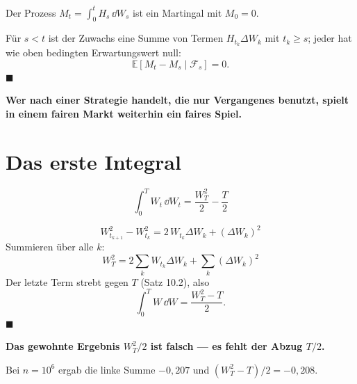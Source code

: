 \begin{merksatz}
Der Prozess $M_t = \int_0^t H_s\,\dd W_s$ ist ein Martingal mit $M_0 = 0$.

Für $s < t$ ist der Zuwachs eine Summe von Termen $H_{t_k}\Delta W_k$ mit $t_k \ge s$; jeder hat wie oben bedingten Erwartungswert null:
\[ \mathbb{E}[M_t - M_s \mid \mathcal F_s] = 0 . \]
$\blacksquare$

\begin{center}
\begin{minipage}{0.9\textwidth}
\textbf{Wer nach einer Strategie handelt, die nur Vergangenes benutzt, spielt in einem fairen Markt weiterhin ein faires Spiel.}
\end{minipage}
\end{center}

\begin{center}
\begin{minipage}{0.88\textwidth}
\end{minipage}
\end{center}
\end{merksatz}

\section{Das erste Integral}

\begin{merksatz}
\[ \int_0^T W_t\,\dd W_t = \frac{W_T^{2}}{2} - \frac{T}{2} \]

\[ W_{t_{k+1}}^{2}-W_{t_k}^{2} = 2\,W_{t_k}\Delta W_k + (\Delta W_k)^{2} \]
Summieren über alle $k$:
\[ W_T^{2} = 2\sum_k W_{t_k}\Delta W_k + \sum_k (\Delta W_k)^{2} \]
Der letzte Term strebt gegen $T$ (Satz 10.2), also
\[ \int_0^T W\,\dd W = \frac{W_T^{2}-T}{2} . \]
$\blacksquare$

\begin{center}
\begin{minipage}{0.9\textwidth}
\textbf{Das gewohnte Ergebnis $W_T^{2}/2$ ist falsch --- es fehlt der Abzug $T/2$.}
\end{minipage}
\end{center}

 Bei $n = 10^{6}$ ergab die linke Summe $-0{,}207$ und $(W_T^{2}-T)/2 = -0{,}208$. \checkmark

\begin{center}
\begin{minipage}{0.88\textwidth}
\end{minipage}
\end{center}
\end{merksatz}

